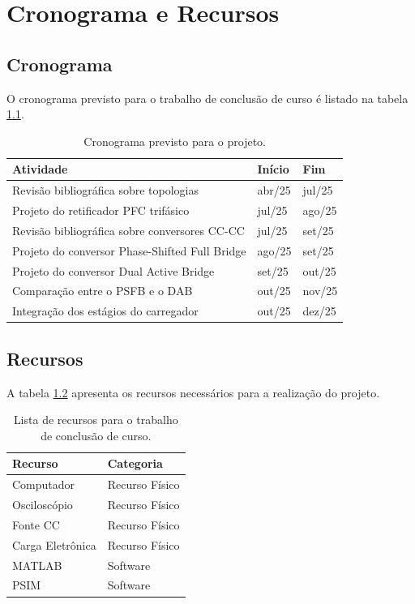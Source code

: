 \chapter{Cronograma e Recursos}
\section{Cronograma}

O cronograma previsto para o trabalho de conclusão de curso é listado na tabela \ref{tab:cronograma}.

\begin{table}[h]
\centering
\caption{Cronograma previsto para o projeto.}
\label{tab:cronograma}
\begin{tabular}{|l|l|l|}
\hline
Atividade                                      & Início & Fim    \\ \hline
Revisão bibliográfica sobre topologias         & abr/25 & jul/25 \\ \hline
Projeto do retificador PFC trifásico           & jul/25 & ago/25 \\ \hline
Revisão bibliográfica sobre conversores CC-CC  & jul/25 & set/25 \\ \hline
Projeto do conversor Phase-Shifted Full Bridge & ago/25 & set/25 \\ \hline
Projeto do conversor Dual Active Bridge        & set/25 & out/25 \\ \hline
Comparação entre o PSFB e o DAB                & out/25 & nov/25 \\ \hline
Integração dos estágios do carregador          & out/25 & dez/25 \\ \hline
\end{tabular}
\end{table}

\section{Recursos}

A tabela \ref{tab:recursos} apresenta os recursos necessários para a realização do projeto.

\begin{table}[h]
    \centering
    \caption{Lista de recursos para o trabalho de conclusão de curso.}
    \label{tab:recursos}
    \begin{tabular}{|l|l|}
        \hline
        Recurso          & Categoria      \\ \hline
        Computador       & Recurso Físico \\ \hline
        Osciloscópio     & Recurso Físico \\ \hline
        Fonte CC         & Recurso Físico \\ \hline
        Carga Eletrônica & Recurso Físico \\ \hline
        MATLAB           & Software       \\ \hline
        PSIM             & Software       \\ \hline
    \end{tabular}
\end{table}